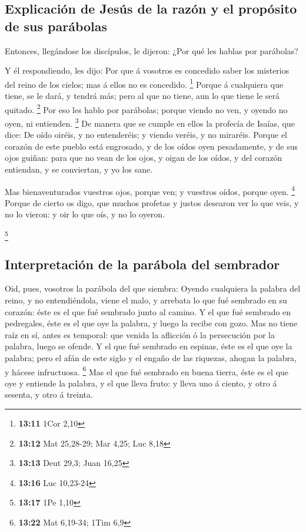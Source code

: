 \hypertarget{explicaciuxf3n-de-jesuxfas-de-la-razuxf3n-y-el-propuxf3sito-de-sus-paruxe1bolas}{%
\subsection{Explicación de Jesús de la razón y el propósito de sus
parábolas}\label{explicaciuxf3n-de-jesuxfas-de-la-razuxf3n-y-el-propuxf3sito-de-sus-paruxe1bolas}}

 Entonces, llegándose los discípulos, le dijeron: ¿Por
qué les hablas por parábolas?

 Y él respondiendo, les dijo: Por que á vosotros es
concedido saber los misterios del reino de los cielos; mas á ellos no es
concedido. \footnote{\textbf{13:11} 1Cor 2,10}  Porque á
cualquiera que tiene, se le dará, y tendrá más; pero al que no tiene,
aun lo que tiene le será quitado. \footnote{\textbf{13:12} Mat 25,28-29;
  Mar 4,25; Luc 8,18}  Por eso les hablo por parábolas;
porque viendo no ven, y oyendo no oyen, ni entienden. \footnote{\textbf{13:13}
  Deut 29,3; Juan 16,25}  De manera que se cumple en
ellos la profecía de Isaías, que dice: De oído oiréis, y no entenderéis;
y viendo veréis, y no miraréis.  Porque el corazón de
este pueblo está engrosado, y de los oídos oyen pesadamente, y de sus
ojos guiñan: para que no vean de los ojos, y oigan de los oídos, y del
corazón entiendan, y se conviertan, y yo los sane.

 Mas bienaventurados vuestros ojos, porque ven; y
vuestros oídos, porque oyen. \footnote{\textbf{13:16} Luc 10,23-24}
 Porque de cierto os digo, que muchos profetas y justos
desearon ver lo que veis, y no lo vieron: y oir lo que oís, y no lo
oyeron.

\footnote{\textbf{13:17} 1Pe 1,10}

\hypertarget{interpretaciuxf3n-de-la-paruxe1bola-del-sembrador}{%
\subsection{Interpretación de la parábola del
sembrador}\label{interpretaciuxf3n-de-la-paruxe1bola-del-sembrador}}

 Oid, pues, vosotros la parábola del que siembra:
 Oyendo cualquiera la palabra del reino, y no
entendiéndola, viene el malo, y arrebata lo que fué sembrado en su
corazón: éste es el que fué sembrado junto al camino.  Y
el que fué sembrado en pedregales, éste es el que oye la palabra, y
luego la recibe con gozo.  Mas no tiene raíz en sí, antes
es temporal: que venida la aflicción ó la persecución por la palabra,
luego se ofende.  Y el que fué sembrado en espinas, éste
es el que oye la palabra; pero el afán de este siglo y el engaño de las
riquezas, ahogan la palabra, y hácese infructuosa. \footnote{\textbf{13:22}
  Mat 6,19-34; 1Tim 6,9}  Mas el que fué sembrado en
buena tierra, éste es el que oye y entiende la palabra, y el que lleva
fruto: y lleva uno á ciento, y otro á sesenta, y otro á treinta.

